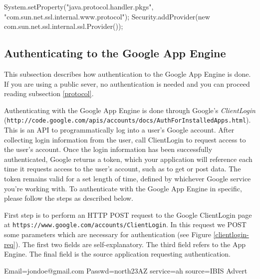 \begin{figure*}[ht] %
\begin{center}
\begin{code}
System.setProperty("java.protocol.handler.pkgs",
                        "com.sun.net.ssl.internal.www.protocol");
Security.addProvider(new com.sun.net.ssl.internal.ssl.Provider());
\end{code}
\caption{Setting up SSL.\label{ssl-setup}}
\end{center}
\end{figure*}

\subsection{Authenticating to the Google App Engine}
\label{auth}
This subsection describes how authentication to the Google App Engine is done. If
you are using a public sever, no authentication is needed and you can proceed
reading subsection \ref{protocol}.

Authenticating with the Google App Engine is done through Google's
\emph{ClientLogin}
(\texttt{http://code.google.com/apis/accounts/docs/AuthForInstalledApps.html}).
This is an API to programmatically log into a user's Google account. After
collecting login information from the user, call ClientLogin to request access
to
the user's account. Once the login information has been successfully
authenticated, Google returns a token, which your application will reference
each
time it requests access to the user's account, such as to get or post data. The
token remains valid for a set length of time, defined by whichever Google
service
you're working with. To authenticate with the Google App Engine in specific,
please follow the steps as described below.

First step is to perform an HTTP POST request to the Google ClientLogin page at
\texttt{https://www.google.com/accounts/ClientLogin}. In this request we POST
some parameters which are necessary for authentication (see Figure
\ref{clientlogin-req}). The first two fields are self-explanatory. The third
field refers to the App Engine. The final field is the source application
requesting authentication.

\begin{figure*}[ht] %
\begin{center}
\begin{code}
Email=jondoe@gmail.com
Passwd=north23AZ
service=ah
source=IBIS Advert
\end{code}
\caption{Authentication Data for ClientLogin.\label{clientlogin-req}}
\end{center}
\end{figure*}


